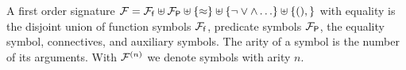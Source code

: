 
\begin{definition}\label{def:signature}
A first order {\myem signature} 
${\mathcal F}= {{\mathcal F}_{\mathsf f}} 
\uplus {{\mathcal F}_{\mathsf P}} 
\uplus \{ \approx \} 
\uplus \{ \lnot \lor \land \ldots \}
\uplus \{( ) ,  \}$ 
with equality is the disjoint union 
of 
{\myem function symbols} ${{\mathcal F}_{\mathsf f}}$, 
{\myem predicate symbols} ${{\mathcal F}_{\mathsf P}}$,
the equality symbol, 
connectives, 
and auxiliary symbols.
%
The {\myem arity} of a symbol is the number of its arguments.
With ${\mathcal F^{(n)}}$ we denote symbols with arity $n$.
\end{definition}

